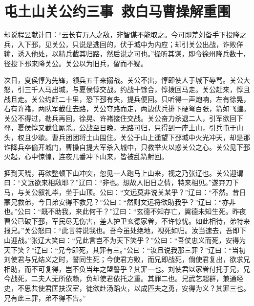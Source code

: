 \chapter{屯土山关公约三事~救白马曹操解重围}

却说程昱献计曰：“云长有万人之敌，非智谋不能取之。今可即差刘备手下投降之兵，入下邳，见关公，只说是逃回的，伏于城中为内应；却引关公出战，诈败佯输，诱入他处，以精兵截其归路，然后说之可也。”操听其谋，即令徐州降兵数十，径投下邳来降关公。关公以为旧兵，留而不疑。

次日，夏侯惇为先锋，领兵五千来搦战。关公不出，惇即使人于城下辱骂。关公大怒，引三千人马出城，与夏侯惇交战。约战十馀合，惇拨回马走。关公赶来，惇且战且走。关公约赶二十里，恐下邳有失，提兵便回。只听得一声炮响，左有徐晃，右有许褚，两队军截住去路，关公夺路而走，两边伏兵排下硬弩百张，箭如飞蝗。关公不得过，勒兵再回，徐晃、许褚接住交战。关公奋力杀退二人，引军欲回下邳，夏侯惇又截住厮杀。公战至日晚，无路可归，只得到一座土山，引兵屯于山头，权且少歇。曹兵团团将土山围住。关公于山上遥望下邳城中火光冲天，却是那诈降兵卒偷开城门，曹操自提大军杀入城中，只教举火以惑关公之心。关公见下邳火起，心中惊惶，连夜几番冲下山来，皆被乱箭射回。

捱到天晓，再欲整顿下山冲突，忽见一人跑马上山来，视之乃张辽也。关公迎谓曰：“文远欲来相敌耶？”辽曰：“非也。想故人旧日之情，特来相见。”遂弃刀下马，与关公叙礼毕，坐于山顶。公曰：“文远莫非说关某乎？”辽曰：“不然。昔日蒙兄救弟，今日弟安得不救兄？”公曰：“然则文远将欲助我乎？”辽曰：“亦非也。”公曰：“既不助我，来此何干？”辽曰：“玄德不知存亡，翼德未知生死。昨夜曹公已破下邳，军民尽无伤害，差人护卫玄德家眷，不许惊忧。如此相待，弟特来报兄。”关公怒曰：“此言特说我也。吾今虽处绝地，视死如归。汝当速去，吾即下山迎战。”张辽大笑曰：“兄此言岂不为天下笑乎？”公曰：“吾仗忠义而死，安得为天下笑？”辽曰：“兄今即死，其罪有三。”公曰：“汝且说我那三罪？”辽曰：“当初刘使君与兄结义之时，誓同生死；今使君方败，而兄即战死，倘使君复出，欲求兄相助，而不可复得，岂不负当年之盟誓乎？其罪一也。刘使君以家眷付托于兄，兄今战死，二夫人无所依赖，负却使君依托之重。其罪二也。兄武艺超群，兼通经史，不思共使君匡扶汉室，徒欲赴汤蹈火，以成匹夫之勇，安得为义？其罪三也。兄有此三罪，弟不得不告。”

